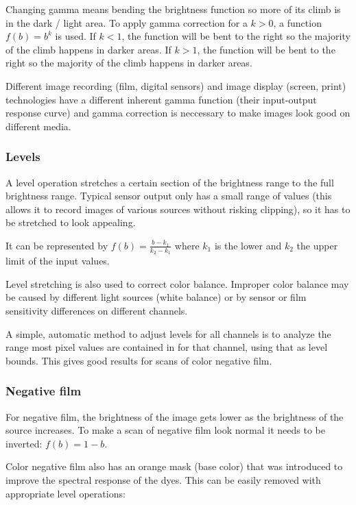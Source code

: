 \documentclass{article}
\begin{document}
Changing gamma means bending the brightness function so more of its climb
is in the dark / light area.
To apply gamma correction for a $k > 0$, a function $f(b) = b^k$ is used.
If $k < 1$, the function will be bent to the right so the majority of the climb
happens in darker areas.
If $k > 1$, the function will be bent to the right so the majority of the climb
happens in darker areas.

Different image recording (film, digital sensors) and image display (screen, print)
technologies have a different inherent gamma function (their input-output response curve)
and gamma correction is neccessary to make images look good on different media.

\subsubsection{Levels}

A level operation stretches a certain section of the brightness range to
the full brightness range. Typical sensor output only has a small range of values
(this allows it to record images of various sources without risking clipping),
so it has to be stretched to look appealing.

It can be represented by $f(b) = \frac{b - k_1}{k_2 - k_1}$ where $k_1$ is the lower
and $k_2$ the upper limit of the input values.

Level stretching is also used to correct color balance. Improper color balance may
be caused by different light sources (white balance) or by sensor or film sensitivity
differences on different channels.

A simple, automatic method to adjust levels for all channels is to analyze the range
most pixel values are contained in for that channel, using that as level bounds.
This gives good results for scans of color negative film.

\subsubsection{Negative film}

For negative film, the brightness of the image gets lower as the brightness of the
source increases. To make a scan of negative film look normal it needs to be inverted:
$f(b) = 1 - b$.

Color negative film also has an orange mask (base color) that was introduced to improve
the spectral response of the dyes. This can be easily removed with appropriate
level operations:
\end{document}
